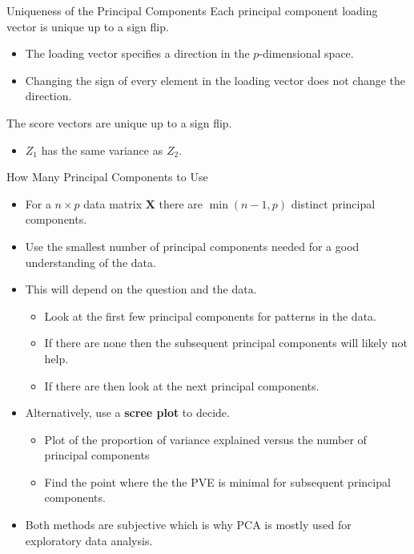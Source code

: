 \documentclass[
  ignorenonframetext,
  aspectratio=169,
]{beamer}
\providecommand{\tightlist}{%
  \setlength{\itemsep}{0pt}\setlength{\parskip}{0pt}}\usepackage{longtable,booktabs,array}
\begin{document}
\begin{frame}{Uniqueness of the Principal Components}
\protect\hypertarget{uniqueness-of-the-principal-components}{}
\alert{Each principal component loading vector is unique up to a sign flip.}

\begin{itemize}
\item
  The loading vector specifies a direction in the \(p\)-dimensional
  space.
\item
  Changing the sign of every element in the loading vector does not
  change the direction.
\end{itemize}

\alert{The score vectors are unique up to a sign flip.}

\begin{itemize}
\tightlist
\item
  \(Z_1\) has the same variance as \(Z_2\).
\end{itemize}
\end{frame}

\begin{frame}{How Many Principal Components to Use}
\protect\hypertarget{how-many-principal-components-to-use}{}
\begin{itemize}
\item
  For a \(n \times p\) data matrix \(\mathbf{X}\) there are
  \(\min(n-1, p)\) distinct principal components.
\item
  \alert{Use the smallest number of principal components needed for a good understanding of the data.}
\item
  This will depend on the question and the data.

  \begin{itemize}
  \item
    Look at the first few principal components for patterns in the data.
  \item
    If there are none then the subsequent principal components will
    likely not help.
  \item
    If there are then look at the next principal components.
  \end{itemize}
\item
  Alternatively, use a \textbf{scree plot} to decide.

  \begin{itemize}
  \item
    Plot of the proportion of variance explained versus the number of
    principal components
  \item
    Find the point where the the PVE is minimal for subsequent principal
    components.
  \end{itemize}
\item
  Both methods are subjective which is why PCA is mostly used for
  exploratory data analysis.
\end{itemize}
\end{frame}
\end{document}

